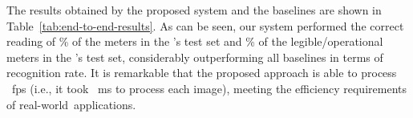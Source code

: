 


The results obtained by the proposed system and the baselines are shown in Table~\ref{tab:end-to-end-results}.
As can be seen, our system performed the correct reading of \% of the meters in the \ufpramr's test set and \% of the legible/operational meters in the \dataset's test set, considerably outperforming all baselines in terms of recognition rate.
It is remarkable that the proposed approach is able to process ~\gls*{fps} (i.e., it took ~ms to process each image), meeting the efficiency requirements of real-world~applications.

